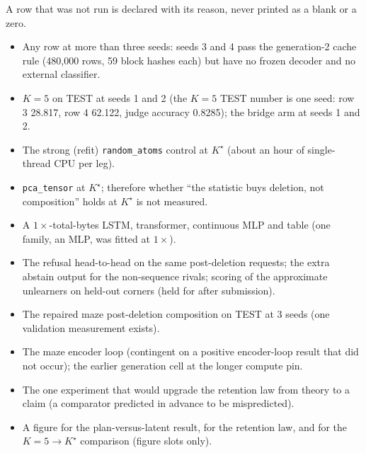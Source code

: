 \documentclass{article} %
\newcommand{\Kstar}{\ensuremath{K^{\star}}}
\begin{document}
A row that was not run is declared with its reason, never printed as a blank or a zero.
\begin{itemize}[leftmargin=*,itemsep=1pt]
\item Any row at more than three seeds: seeds 3 and 4 pass the generation-2 cache rule
  (480,000 rows, 59 block hashes each) but have no frozen decoder and no external classifier.
\item $K=5$ on TEST at seeds 1 and 2 (the $K=5$ TEST number is one seed: row 3 28.817, row 4
  62.122, judge accuracy 0.8285); the bridge arm at seeds 1 and 2. %
\item The strong (refit) \texttt{random\_atoms} control at $\Kstar$ (about an hour of
  single-thread CPU per leg). %
\item \texttt{pca\_tensor} at $\Kstar$; therefore whether ``the statistic buys deletion, not
  composition'' holds at $\Kstar$ is not measured.
\item A $1\times$-total-bytes LSTM, transformer, continuous MLP and table (one family, an MLP, was
  fitted at $1\times$).
\item The refusal head-to-head on the same post-deletion requests; the extra abstain output for the
  non-sequence rivals; scoring of the approximate unlearners on held-out corners (held for after
  submission).
\item The repaired maze post-deletion composition on TEST at 3 seeds (one validation measurement
  exists).
\item The maze encoder loop (contingent on a positive encoder-loop result that did not occur); the
  earlier generation cell at the longer compute pin.
\item The one experiment that would upgrade the retention law from theory to a claim (a comparator
  predicted in advance to be mispredicted).
\item A figure for the plan-versus-latent result, for the retention law, and for the $K=5\to\Kstar$
  comparison (figure slots only).
\end{itemize}

\end{document}
